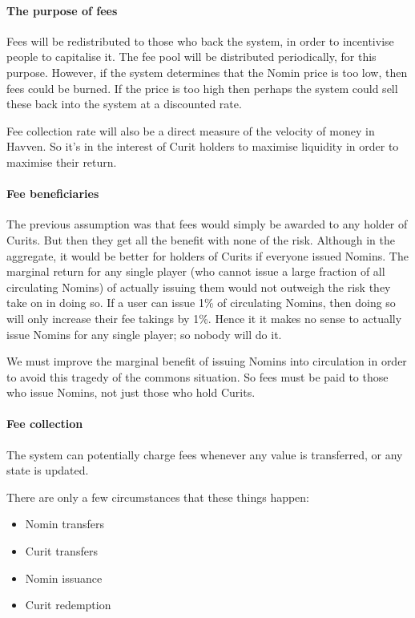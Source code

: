 \paragraph{The purpose of fees}

Fees will be redistributed to those who back the system, in order to incentivise people to capitalise it. The fee pool will be distributed periodically, for this purpose. However, if the system determines that the Nomin price is too low, then fees could be burned. If the price is too high then perhaps the system could sell these back into the system at a discounted rate.

Fee collection rate will also be a direct measure of the velocity of money in Havven. So it's in the interest of Curit holders to maximise liquidity in order to maximise their return.

\paragraph{Fee beneficiaries}

The previous assumption was that fees would simply be awarded to any holder of Curits. But then they get all the benefit with none of the risk. Although in the aggregate, it would be better for holders of Curits if everyone issued Nomins. The marginal return for any single player (who cannot issue a large fraction of all circulating Nomins) of actually issuing them would not outweigh the risk they take on in doing so. If a user can issue 1\% of circulating Nomins, then doing so will only increase their fee takings by 1\%.
Hence it it makes no sense to actually issue Nomins for any single player; so nobody will do it.

We must improve the marginal benefit of issuing Nomins into circulation in order to avoid this tragedy of the commons situation. So fees must be paid to those who issue Nomins, not just those who hold Curits.

\paragraph{Fee collection}

The system can potentially charge fees whenever any value is transferred, or any state is updated.

There are only a few circumstances that these things happen:

\begin{itemize}
    \item Nomin transfers
    \item Curit transfers
    \item Nomin issuance
    \item Curit redemption
\end{itemize}

